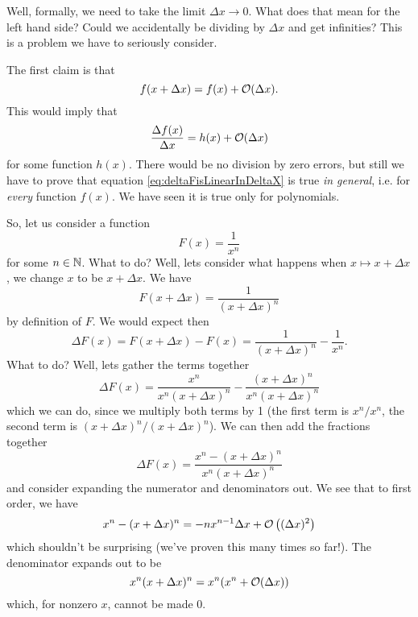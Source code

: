 Well, formally, we need to take the limit $\Delta x\to 0$. What
does that mean for the left hand side? Could we accidentally be
dividing by $\Delta x$ and get infinities? This is a problem we
have to seriously consider.

The first claim is that
\begin{equation}\label{eq:deltaFisLinearInDeltaX}
f(x+\Delta x)=f(x)+\mathcal{O}(\Delta x).
\end{equation}
This would imply that
\begin{equation}
\frac{\Delta f(x)}{\Delta x} = h(x)+\mathcal{O}(\Delta x)
\end{equation}
for some function $h(x)$. There would be no division by zero
errors, but still we have to prove that equation
\eqref{eq:deltaFisLinearInDeltaX} is true \emph{in general},
i.e. for \emph{every} function $f(x)$. We have seen it is true
only for polynomials.

So, let us consider a function
\begin{equation}
F(x)=\frac{1}{x^{n}}
\end{equation}
for some $n\in\mathbb{N}$. What to do? Well, lets consider what happens
when $x\mapsto x+\Delta x$, we change $x$ to be $x+\Delta x$. We have
\begin{equation}
F(x+\Delta x)=\frac{1}{(x+\Delta x)^{n}}
\end{equation}
by definition of $F$. We would expect then
\begin{equation}
\Delta F(x)=F(x+\Delta x)-F(x)=\frac{1}{(x+\Delta x)^{n}}-\frac{1}{x^{n}}.
\end{equation}
What to do? Well, lets gather the terms together
\begin{equation}
\Delta F(x)=\frac{x^{n}}{x^{n}(x+\Delta x)^{n}}-\frac{(x+\Delta
x)^{n}}{x^{n}(x+\Delta x)^{n}}
\end{equation}
which we can do, since we multiply both terms by 1 (the first
term is $x^{n}/x^{n}$, the second term is $(x+\Delta
x)^{n}/(x+\Delta x)^{n}$). We can then add the fractions together
\begin{equation}
\Delta F(x)=\frac{x^{n}-(x+\Delta x)^{n}}{x^{n}(x+\Delta x)^{n}}
\end{equation}
and consider expanding the numerator and denominators out. We see
that to first order, we have
\begin{equation}
x^{n}-(x+\Delta x)^{n}=-nx^{n-1}\Delta x+\mathcal{O}\left((\Delta
x)^{2}\right)
\end{equation}
which shouldn't be surprising (we've proven this many times so
far!). The denominator expands out to be
\begin{equation}
x^{n}(x+\Delta x)^{n}=x^{n}(x^{n}+\mathcal{O}(\Delta x))
\end{equation}
which, for nonzero $x$, cannot be made 0.


